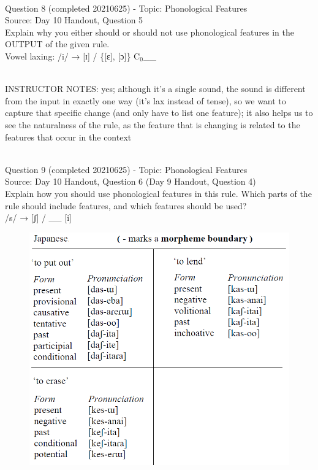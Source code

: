 \documentclass[12pt]{article}
\begin{document}
~\\

{\large Question 8} (completed 20210625) - Topic: Phonological Features\\
Source: Day 10 Handout, Question 5\\

Explain why you either should or should not use phonological features in the OUTPUT of the given rule.\\

Vowel laxing: /i/ → {[ɪ]} / \{{[ɛ]}, {[ɔ]}\} C$_0$\_\_


~\\
INSTRUCTOR NOTES: yes; although it's a single sound, the sound is different from the input in exactly one way (it's lax instead of tense), so we want to capture that specific change (and only have to list one feature); it also helps us to see the naturalness of the rule, as the feature that is changing is related to the features that occur in the context


~\\

{\large Question 9} (completed 20210625) - Topic: Phonological Features\\
Source: Day 10 Handout, Question 6 (Day 9 Handout, Question 4)\\

Explain how you should use phonological features in this rule. Which parts of the rule should include features, and which features should be used?\\

/s/ → {[ʃ]} / \_\_ {[i]}

\begin{figure}[H]
\includegraphics{../images/japanese_verbs.png}
\end{figure}
\end{document}
